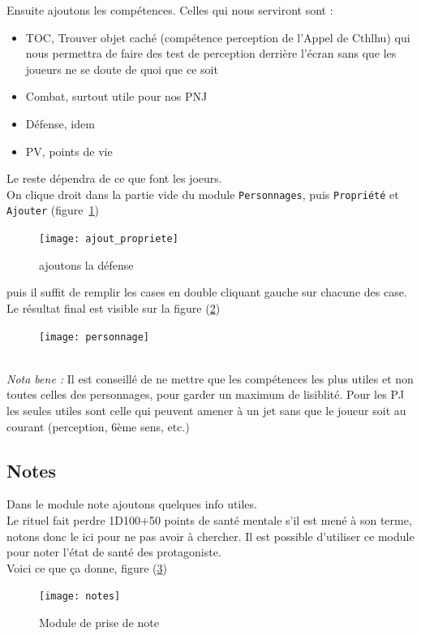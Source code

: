 \documentclass[a4paper,12pt]{article}
\newcommand*{\interfaceitem}[1]{\texttt{#1}}
\begin{document}
Ensuite ajoutons les compétences. Celles qui nous serviront sont :
\begin{itemize}
    \item TOC, Trouver objet caché (compétence perception de l'Appel de Cthlhu) qui nous permettra de faire des test de perception derrière l'écran sans que les joueurs ne se doute de quoi que ce soit
    \item Combat, surtout utile pour nos PNJ
    \item Défense, idem
    \item PV, points de vie
\end{itemize}
Le reste dépendra de ce que font les joeurs.
\\
On clique droit dans la partie vide du module \interfaceitem{Personnages}, puis \interfaceitem{Propriété} et \interfaceitem{Ajouter} (figure~\ref{ajout_propriete})
\begin{figure}[h!]
    \texttt{[image: ajout\_propriete]}
    \caption{ajoutons la défense}
    \label{ajout_propriete}
\end{figure}
puis il suffit de remplir les cases en double cliquant gauche sur chacune des case.
\\
Le résultat final est visible sur la figure (\ref{exemple_personnage})
\begin{figure}[h!]
    \texttt{[image: personnage]}
    \label{exemple_personnage}
\end{figure}
\\ \emph{Nota bene :} Il est conseillé de ne mettre que les compétences les plus utiles et non toutes celles des personnages, pour garder un maximum de lisiblité. Pour les PJ les seules utiles sont celle qui peuvent amener à un jet sans que le joueur soit au courant (perception, 6ème sens, etc.)

\subsection{Notes}
Dans le module note ajoutons quelques info utiles.
\\
Le rituel fait perdre 1D100+50 points de santé mentale s'il est mené à son terme, notons donc le ici pour ne pas avoir à chercher.
Il est possible d'utiliser ce module pour noter l'état de santé des protagoniste.
\\
Voici ce que ça donne, figure (\ref{note})
\begin{figure}[h!]
    \texttt{[image: notes]}
    \caption{Module de prise de note}
    \label{note}
\end{figure}
\end{document}
